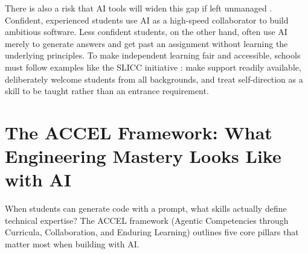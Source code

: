\documentclass[11pt]{article}
\begin{document}
There is also a risk that AI tools will widen this gap if left unmanaged \citep{ravi2025}. Confident, experienced students use AI as a high-speed collaborator to build ambitious software. Less confident students, on the other hand, often use AI merely to generate answers and get past an assignment without learning the underlying principles. To make independent learning fair and accessible, schools must follow examples like the SLICC initiative \citep{spiers2020}: make support readily available, deliberately welcome students from all backgrounds, and treat self-direction as a skill to be taught rather than an entrance requirement.

\section{The ACCEL Framework: What Engineering Mastery Looks Like with AI}

When students can generate code with a prompt, what skills actually define technical expertise? The ACCEL framework (Agentic Competencies through Curricula, Collaboration, and Enduring Learning) \citep{agenticengineer2026} outlines five core pillars that matter most when building with AI.
\end{document}

